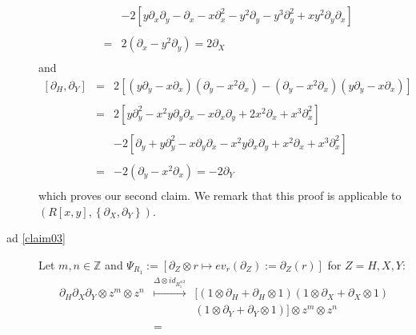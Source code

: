 \documentclass[10pt,a4paper]{article}
\begin{document}
\begin{description}
$$\begin{array}{rcl}
&&\\
&& - 2\left[y \partial_x \partial_y - \partial_x - x \partial_x^2 - y^2 \partial_y - y^3 \partial_y ^2 + x y^2 \partial_y \partial_x\right]\\
&&\\
&=& 2 \left(\partial_x - y^2 \partial_y\right) = 2 \partial_X\\
\end{array}$$
and
$$\begin{array}{rcl}
[\partial_H, \partial_Y] &=& 2 [(y \partial_y - x \partial_x)(\partial_y - x^2 \partial_x) - (\partial_y - x^2 \partial_x)(y \partial_y - x \partial_x)]\\
&&\\
&=& 2 \left[y \partial_y^ 2 - x^2 y \partial_y \partial_x - x \partial_x \partial_y + 2 x^2 \partial_x + x^3 \partial_x^2\right]\\
&&\\
&& - 2\left[\partial_y + y \partial_y^2 - x \partial_y \partial_x - x^2 y \partial_x \partial_y + x^2 \partial_x + x^3 \partial_x^2\right]\\
&&\\
&=& -2 \left(\partial_y - x^2 \partial_x\right) = -2 \partial_Y\\
\end{array}$$
which proves our second claim. We remark that this proof is applicable to $\left(R[x,y], \left\{\partial_X,\partial_Y\right\}\right)$.
\item[ad \ref{claim03}] Let %
$m, n \in \mathbb{Z}$ and $\Psi_{R_1} := \left[\partial_Z \otimes r \longmapsto ev_r(\partial_Z) := \partial_Z(r)\right]$ for $Z = H, X, Y$:
$$\begin{array}{rcl}
\partial_H \partial_X \partial_Y \otimes z^m \otimes z^n &\stackrel{\Delta \otimes id_{R_1^{\otimes 2}}}{\longmapsto}& [(1 \otimes \partial_H + \partial_H \otimes 1) (1 \otimes \partial_X + \partial_X \otimes 1)\\
&& (1 \otimes \partial_Y + \partial_Y \otimes 1)] \otimes z^m \otimes z^n\\
&&\\
&=& %

\end{array}$$
\end{description}
\end{document}

